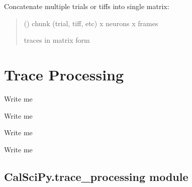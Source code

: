 \documentclass[letterpaper,10pt,english]{sphinxmanual}
\begin{document}
\begin{fulllineitems}
\label{\detokenize{CalSciPy.reorganization:CalSciPy.reorganization.merge_tensor}}
\pysigstartsignatures
{}
\pysigstopsignatures
\sphinxAtStartPar
Concatenate multiple trials or tiffs into single matrix:
\begin{quote}\begin{description}
\sphinxAtStartPar
{} () \sphinxhyphen{}\sphinxhyphen{} chunk (trial, tiff, etc) x neurons x frames

\sphinxAtStartPar
traces in matrix form

\sphinxAtStartPar
{}

\end{description}\end{quote}

\end{fulllineitems}



\section{Trace Processing}
\label{\detokenize{Sub-Packages:trace-processing}}\label{\detokenize{Sub-Packages:trace-processing-module}}
\begin{DUlineblock}{0em}
\item[] Write me
\item[] Write me
\item[] Write me
\item[] Write me
\end{DUlineblock}

\sphinxstepscope


\subsection{CalSciPy.trace\_processing module}
\label{\detokenize{CalSciPy.trace_processing:module-CalSciPy.trace_processing}}\label{\detokenize{CalSciPy.trace_processing:calscipy-trace-processing-module}}\label{\detokenize{CalSciPy.trace_processing::doc}}
\end{document}
